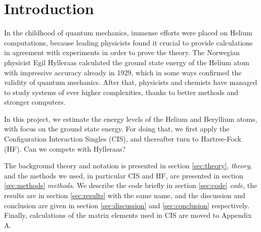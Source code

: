 \section{Introduction} \label{sec:introduction}
In the childhood of quantum mechanics, immense efforts were placed on Helium computations, because leading physicists found it crucial to provide calculations in agreement with experiments in order to prove the theory. The Norwegian physicist Egil Hylleraas calculated the ground state energy of the Helium atom with impressive accuracy already in 1929, which in some ways confirmed the validity of quantum mechanics. After that, physicists and chemists have managed to study systems of ever higher complexities, thanks to better methods and stronger computers.

In this project, we estimate the energy levels of the Helium and Beryllium atoms, with focus on the ground state energy. For doing that, we first apply the Configuration Interaction Singles (CIS), and thereafter turn to Hartree-Fock (HF). Can we compete with Hylleraas?

The background theory and notation is presented in section \eqref{sec:theory}, \textit{theory}, and the methods we used, in particular CIS and HF, are presented in section \eqref{sec:methods} \textit{methods}. We describe the code briefly in section \eqref{sec:code} \textit{code}, the results are in section \eqref{sec:results} with the same name, and the discussion and conclusion are given in section \eqref{sec:discussion} and \eqref{sec:conclusion} respectively. Finally, calculations of the matrix elements used in CIS are moved to Appendix A.
